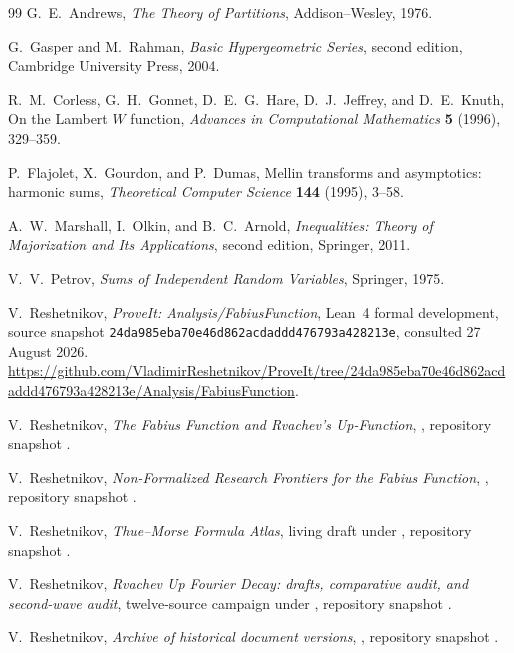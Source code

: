 \documentclass[11pt]{article}
\numberwithin{equation}{section}
\theoremstyle{definition}
\theoremstyle{remark}
\begin{document}
\begin{thebibliography}{99}
G.~E.~Andrews,
\newblock \emph{The Theory of Partitions},
\newblock Addison--Wesley, 1976.

G.~Gasper and M.~Rahman,
\newblock \emph{Basic Hypergeometric Series}, second edition,
\newblock Cambridge University Press, 2004.

R.~M.~Corless, G.~H.~Gonnet, D.~E.~G.~Hare, D.~J.~Jeffrey, and D.~E.~Knuth,
\newblock On the Lambert $W$ function,
\newblock \emph{Advances in Computational Mathematics} \textbf{5} (1996), 329--359.

P.~Flajolet, X.~Gourdon, and P.~Dumas,
\newblock Mellin transforms and asymptotics: harmonic sums,
\newblock \emph{Theoretical Computer Science} \textbf{144} (1995), 3--58.

A.~W.~Marshall, I.~Olkin, and B.~C.~Arnold,
\newblock \emph{Inequalities: Theory of Majorization and Its Applications}, second edition,
\newblock Springer, 2011.

V.~V.~Petrov,
\newblock \emph{Sums of Independent Random Variables},
\newblock Springer, 1975.

V.~Reshetnikov,
\newblock \emph{ProveIt: Analysis/FabiusFunction},
\newblock Lean~4 formal development, source snapshot
\texttt{24da985eba70e46d862acdaddd476793a428213e}, consulted 27 August 2026.
\newblock \url{https://github.com/VladimirReshetnikov/ProveIt/tree/24da985eba70e46d862acdaddd476793a428213e/Analysis/FabiusFunction}.

V.~Reshetnikov,
\newblock \emph{The Fabius Function and Rvachev's Up-Function},
\newblock {},
repository snapshot \cite{p10:proveit}.

V.~Reshetnikov,
\newblock \emph{Non-Formalized Research Frontiers for the Fabius Function},
\newblock {},
repository snapshot \cite{p10:proveit}.

V.~Reshetnikov,
\newblock \emph{Thue--Morse Formula Atlas},
\newblock living draft under
,
repository snapshot \cite{p10:proveit}.

V.~Reshetnikov,
\newblock \emph{Rvachev Up Fourier Decay: drafts, comparative audit, and second-wave audit},
\newblock twelve-source campaign under
,
repository snapshot \cite{p10:proveit}.

V.~Reshetnikov,
\newblock \emph{Archive of historical document versions},
\newblock {}, repository snapshot
\cite{p10:proveit}.

\end{thebibliography}
\end{document}

